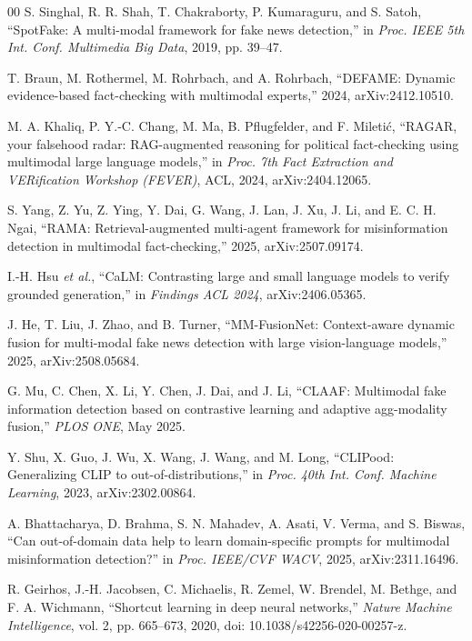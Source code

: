 \documentclass[pdflatex,sn-mathphys-num]{sn-jnl}
\begin{document}
\begin{thebibliography}{00}
 S. Singhal, R. R. Shah, T. Chakraborty, P. Kumaraguru, and
S. Satoh, ``SpotFake: A multi-modal framework for fake news detection,'' in
\emph{Proc. IEEE 5th Int. Conf. Multimedia Big Data}, 2019, pp. 39--47.

 T. Braun, M. Rothermel, M. Rohrbach, and A. Rohrbach,
``DEFAME: Dynamic evidence-based fact-checking with multimodal experts,''
2024, arXiv:2412.10510.

 M. A. Khaliq, P. Y.-C. Chang, M. Ma, B. Pflugfelder, and
F. Mileti\'{c}, ``RAGAR, your falsehood radar: RAG-augmented reasoning for
political fact-checking using multimodal large language models,'' in
\emph{Proc. 7th Fact Extraction and VERification Workshop (FEVER)}, ACL, 2024,
arXiv:2404.12065.

 S. Yang, Z. Yu, Z. Ying, Y. Dai, G. Wang, J. Lan, J. Xu,
J. Li, and E. C. H. Ngai, ``RAMA: Retrieval-augmented multi-agent framework for
misinformation detection in multimodal fact-checking,'' 2025,
arXiv:2507.09174.

 I.-H. Hsu \emph{et al.}, ``CaLM: Contrasting large and small
language models to verify grounded generation,'' in \emph{Findings ACL 2024},
arXiv:2406.05365.

 J. He, T. Liu, J. Zhao, and B. Turner,
``MM-FusionNet: Context-aware dynamic fusion for multi-modal fake news
detection with large vision-language models,'' 2025, arXiv:2508.05684.

 G. Mu, C. Chen, X. Li, Y. Chen, J. Dai, and J. Li, ``CLAAF:
Multimodal fake information detection based on contrastive learning and
adaptive agg-modality fusion,'' \emph{PLOS ONE}, May 2025.

 Y. Shu, X. Guo, J. Wu, X. Wang, J. Wang, and M. Long,
``CLIPood: Generalizing CLIP to out-of-distributions,'' in \emph{Proc. 40th
Int. Conf. Machine Learning}, 2023, arXiv:2302.00864.

 A. Bhattacharya, D. Brahma, S. N. Mahadev, A. Asati,
V. Verma, and S. Biswas, ``Can out-of-domain data help to learn domain-specific prompts for
multimodal misinformation detection?'' in \emph{Proc. IEEE/CVF WACV}, 2025,
arXiv:2311.16496.

 R. Geirhos, J.-H. Jacobsen, C. Michaelis, R. Zemel,
W. Brendel, M. Bethge, and F. A. Wichmann, ``Shortcut learning in deep neural
networks,'' \emph{Nature Machine Intelligence}, vol. 2, pp. 665--673, 2020,
doi: 10.1038/s42256-020-00257-z.


\end{thebibliography}
\end{document}
